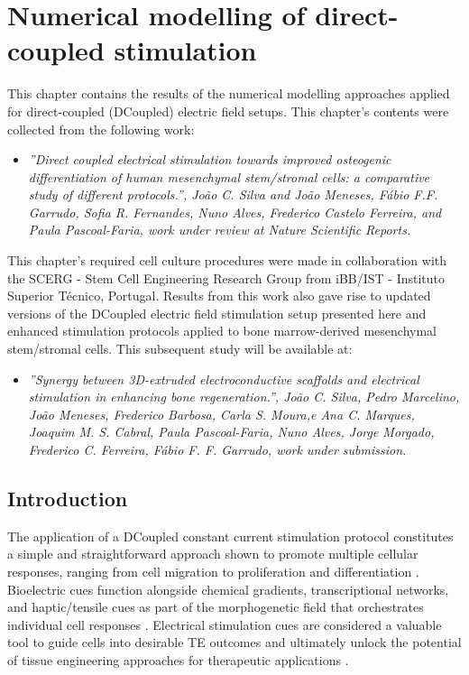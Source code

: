 %
%



\newpage
\chapter{Numerical modelling of direct-coupled stimulation}
This chapter contains the results of the numerical modelling approaches applied for direct-coupled (DCoupled) electric field setups. This chapter's contents were collected from the following work:
\begin{itemize}
\item \small \textit{''Direct coupled electrical stimulation towards improved osteogenic differentiation of human mesenchymal stem/stromal cells: a comparative study of different protocols.'', João C. Silva and João Meneses, Fábio F.F. Garrudo, Sofia R. Fernandes, Nuno Alves, Frederico Castelo Ferreira, and Paula Pascoal-Faria, work under review at Nature Scientific Reports.} 
\end{itemize}

This chapter's required cell culture procedures were made in collaboration with the SCERG - Stem Cell Engineering Research Group from iBB/IST - Instituto Superior Técnico, Portugal. Results from this work also gave rise to updated versions of the DCoupled electric field stimulation setup presented here and enhanced stimulation protocols applied to bone marrow-derived mesenchymal stem/stromal cells. This subsequent study will be available at:
\begin{itemize}
\item \small \textit{''Synergy between 3D-extruded electroconductive scaffolds and electrical stimulation in enhancing bone regeneration.'', João C. Silva, Pedro Marcelino, João Meneses, Frederico Barbosa, Carla S. Moura,e Ana C. Marques, Joaquim M. S. Cabral, Paula Pascoal-Faria, Nuno Alves, Jorge Morgado, Frederico C. Ferreira, Fábio F. F. Garrudo, work under submission.}
\end{itemize}  





\newpage
\section{Introduction}
The application of a \ac{DCoupled} constant current stimulation protocol constitutes a simple and straightforward approach shown to promote multiple cellular responses, ranging from cell migration to proliferation and differentiation \cite{Guillot-Ferriols2022-wn, Song2007-qr}. Bioelectric cues function alongside chemical gradients, transcriptional networks, and haptic/tensile cues as part of the morphogenetic field that orchestrates individual cell responses \cite{Tseng2013-yx, Da_Silva2020-su, Guillot-Ferriols2022-wn}. Electrical stimulation cues are considered a valuable tool to guide cells into desirable \ac{TE} outcomes and ultimately unlock the potential of tissue engineering approaches for therapeutic applications \cite{Da_Silva2020-su}.

